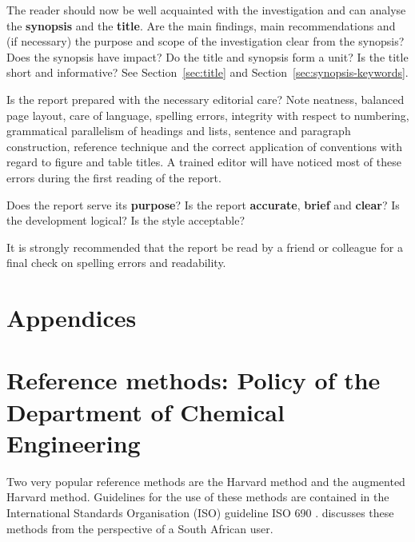 \documentclass[a5paper, 10pt]{article}
\newcommand{\strongemph}[1]{\textbf{#1}}
\begin{document}
The reader should now be well acquainted with the investigation and
can analyse the \strongemph{synopsis} and the \strongemph{title}.  Are
the main findings, main recommendations and (if necessary) the purpose
and scope of the investigation clear from the synopsis?  
Does the synopsis have impact?
Do the title and synopsis form a unit?  Is the title short and informative?  See
Section~\ref{sec:title} and Section~\ref{sec:synopsis-keywords}.

Is the report prepared with the necessary editorial care?  Note
neatness, balanced page layout, care of language, spelling errors,
integrity with respect to numbering, grammatical parallelism of
headings and lists, sentence and paragraph construction, reference
technique and the correct application of conventions with regard to
figure and table titles.  A trained editor will have noticed most of
these errors during the first reading of the report.

Does the report serve its \strongemph{purpose}?  Is the report
\strongemph{accurate}, \strongemph{brief} and \strongemph{clear}?  Is
the development logical?  Is the style acceptable?

It is strongly recommended that the report be read by a friend or
colleague for a final check on spelling errors and readability.




\section{Appendices}
\appendix
\makeatletter
\def\@seccntformat#1{\csname Pref@#1\endcsname \csname the#1\endcsname\quad}
\def\Pref@section{Appendix~}
\makeatother

\section[Reference Methods: Policy of the Department of \\Chemical Engineering]{Reference methods: Policy of the \\Department of Chemical Engineering}
\label{app:reference_methods}
Two very popular reference methods are the Harvard method and the
augmented Harvard method.  Guidelines for the use of these methods are
contained in the International Standards Organisation (ISO) guideline
ISO 690 \citep{ISO690}.  \citet{burger} discusses these methods from
the perspective of a South African user.
\end{document}
